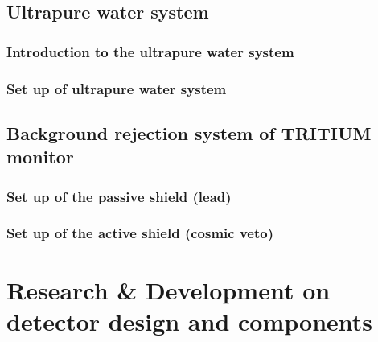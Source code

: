 \documentclass[12pt,a4paper]{book}
\begin{document}
	\section{Ultrapure water system}\label{sec:UltraPureWaterSystem}
		
		\subsection[Introduction water system]{Introduction to the ultrapure water system}\label{subsec:IntroductionWaterSystem}
		 
					
		\subsection[Set up water system]{Set up of ultrapure water system}\label{subsec:SetUpWaterSystem}
		
		\newpage	
	
	\section[Background rejection system]{Background rejection system of TRITIUM monitor}\label{sec:IntroductionBackground}
	 
	
		\subsection[Set up passive shield]{Set up of the passive shield (lead)}\label{subsec:SetUpPassiveShield}
		
		
		\subsection[Set up Cosmic veto]{Set up of the active shield (cosmic veto)}\label{subsec:SetUpActiveShield}
		
		\newpage
					
\chapter[Research \& Development]{Research \& Development on detector design and components}\label{chap:ResearchandDevelopment}
\end{document}
